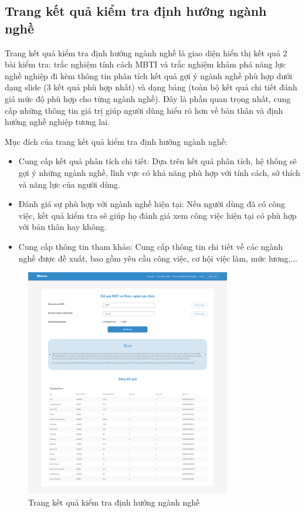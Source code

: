\subsection{Trang kết quả kiểm tra định hướng ngành nghề}
Trang kết quả kiểm tra định hướng ngành nghề là giao diện hiển thị kết quả 2 bài kiểm tra: trắc nghiệm tính cách MBTI và trắc nghiệm khám phá năng lực nghề nghiệp đi kèm thông tin phân tích kết quả gợi ý ngành nghề phù hợp dưới dạng slide (3 kết quả phù hợp nhất) và dạng bảng (toàn bộ kết quả chi tiết đánh giá mức độ phù hợp cho từng ngành nghề). Đây là phần quan trọng nhất, cung cấp những thông tin giá trị giúp người dùng hiểu rõ hơn về bản thân và định hướng nghề nghiệp tương lai.

Mục đích của trang kết quả kiểm tra định hướng ngành nghề:
\begin{itemize}
    \item Cung cấp kết quả phân tích chi tiết: Dựa trên kết quả phân tích, hệ thống sẽ gợi ý những ngành nghề, lĩnh vực có khả năng phù hợp với tính cách, sở thích và năng lực của người dùng.
    \item Đánh giá sự phù hợp với ngành nghề hiện tại: Nếu người dùng đã có công việc, kết quả kiểm tra sẽ giúp họ đánh giá xem công việc hiện tại có phù hợp với bản thân hay không.
    \item Cung cấp thông tin tham khảo: Cung cấp thông tin chi tiết về các ngành nghề được đề xuất, bao gồm yêu cầu công việc, cơ hội việc làm, mức lương,...
\end{itemize}

\begin{figure}[H]
    \centering
    \includegraphics[width=0.8\textwidth]
    {images/chap5/majorResult.png}
    \vspace{0.6cm}
    \caption{Trang kết quả kiểm tra định hướng ngành nghề}
\end{figure}

